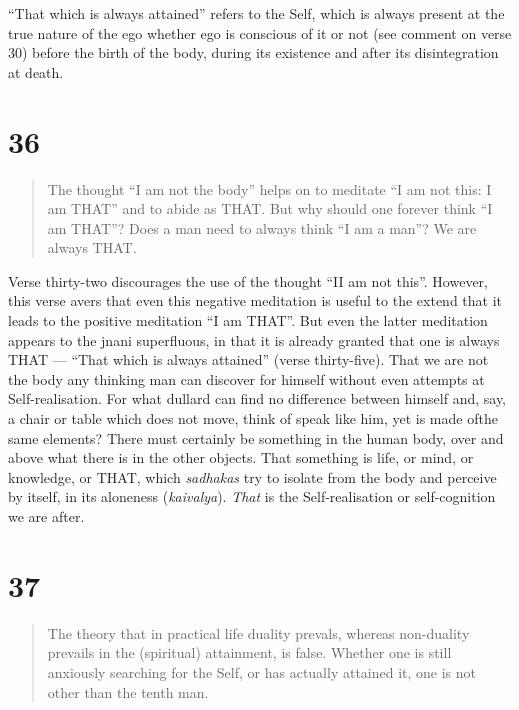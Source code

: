 \documentclass[12pt]{report}
\begin{document}
{``That which is always attained'' refers to the Self, which is always
present at the true nature of the ego whether ego is conscious of it
or not (see comment on verse 30) before the birth of the body, during
its existence and after its disintegration at death.

\section*{36}

\begin{quote}
  The thought ``I am not the body'' helps on to meditate ``I am not
  this: I am THAT'' and to abide as THAT. But why should one forever
  think ``I am THAT''? Does a man need to always think ``I am a man''?
  We are always THAT.
\end{quote}

\index{}

Verse thirty-two discourages the use of the thought ``II am not
this''. However, this verse avers that even this negative meditation
is useful to the extend that it leads to the positive meditation ``I
am THAT''. But even the latter meditation appears to the jnani
superfluous, in that it is already granted that one is always THAT ---
``That which is always attained'' (verse thirty-five). That we are not
the body any thinking man can discover for himself without even
attempts at Self-realisation. For what dullard can find no difference
between himself and, say, a chair or table which does not move, think
of speak like him, yet is made ofthe same elements? There must
certainly be something in the human body, over and above what there is
in the other objects. That something is life, or mind, or knowledge,
or THAT, which \emph{sadhakas} try to isolate from the body and
perceive by itself, in its aloneness (\emph{kaivalya}). \emph{That} is
the Self-realisation or self-cognition we are after.

\section*{37}

\begin{quote}
  The theory that in practical life duality prevals, whereas
  non-duality prevails in the (spiritual) attainment, is
  false. Whether one is still anxiously searching for the Self, or has
  actually attained it, one is not other than the tenth man.
\end{quote}

}
\end{document}
